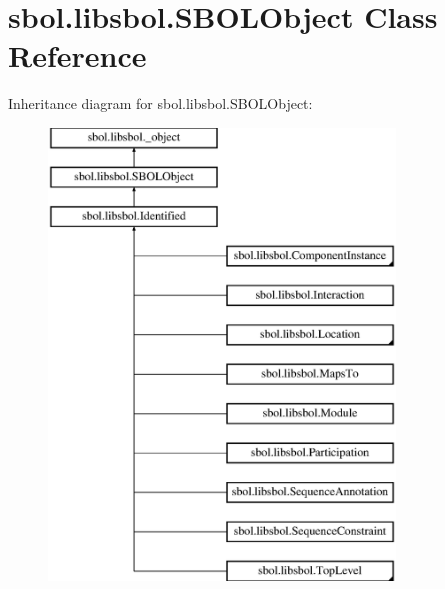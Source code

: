 \hypertarget{classsbol_1_1libsbol_1_1_s_b_o_l_object}{}\section{sbol.\+libsbol.\+S\+B\+O\+L\+Object Class Reference}
\label{classsbol_1_1libsbol_1_1_s_b_o_l_object}
Inheritance diagram for sbol.\+libsbol.\+S\+B\+O\+L\+Object\+:\begin{figure}[H]
\begin{center}
\leavevmode
\includegraphics[height=12.000000cm]{classsbol_1_1libsbol_1_1_s_b_o_l_object}
\end{center}
\end{figure}
